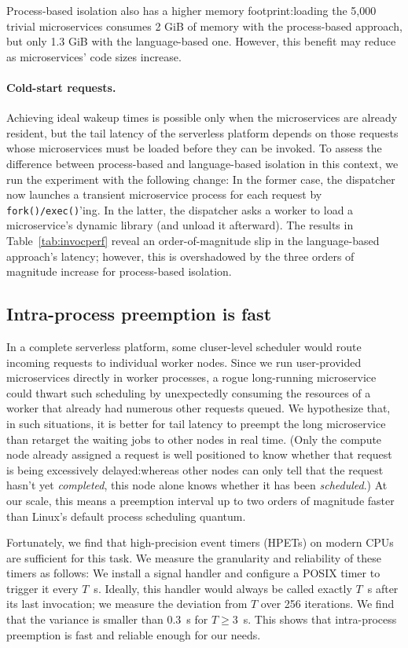 Process-based isolation also has a higher memory footprint:\@ loading the 5,000
trivial microservices consumes 2 GiB of memory with the process-based approach, but
only 1.3 GiB with the language-based one.  However, this benefit may reduce as
microservices' code sizes increase.

\paragraph{Cold-start requests.}
Achieving ideal wakeup times is possible only when the microservices are
already resident, but the tail latency of the serverless platform depends on
those requests whose microservices must be loaded
before they can be invoked.  To assess the difference between process-based and
language-based isolation in this context, we run the experiment with the following
change:  In the former case, the dispatcher now launches a transient
microservice process for each request by \texttt{fork()/exec()}'ing.  In the latter,
the dispatcher asks a worker to load a microservice's dynamic library (and
unload it afterward).  The results in Table~\ref{tab:invocperf} reveal an
order-of-magnitude slip in the language-based approach's latency; however, this is
overshadowed by the three orders of magnitude increase for process-based
isolation.

\subsection{Intra-process preemption is fast}
In a complete serverless platform, some cluser-level scheduler would route incoming
requests to individual worker nodes.  Since we run user-provided
microservices directly in worker processes, a rogue long-running microservice could
thwart such scheduling by unexpectedly consuming the resources of a worker that
already had numerous other requests queued.  We hypothesize that, in such situations,
it is better for tail latency to preempt the long microservice than retarget the
waiting jobs to other nodes in real time.  (Only the compute node already assigned a
request is well positioned to know whether that request is being excessively
delayed:\@ whereas other nodes can only tell that the request hasn't yet
\textit{completed}, this node alone knows whether it has been \textit{scheduled}.)
At our scale, this means a preemption interval up to two orders of magnitude faster
than Linux's default  process scheduling quantum.

Fortunately, we find that high-precision event timers (HPETs) on modern CPUs
are sufficient for this task. We measure the granularity and reliability of
these timers as follows: We install a signal handler and configure a POSIX timer to
trigger it every $T$~\textmu{}s.
Ideally, this handler would always be called exactly $T$~\textmu{}s after its last
invocation; we measure the deviation from $T$ over 256 iterations.
We find that the variance
is smaller than 0.3~\textmu{}s for $T \ge 3$~\textmu{}s. This shows that
intra-process preemption is fast and reliable enough for our needs.
